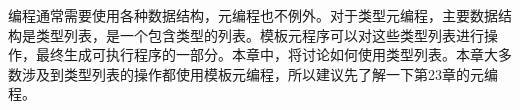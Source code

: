 编程通常需要使用各种数据结构，元编程也不例外。对于类型元编程，主要数据结构是类型列表，是一个包含类型的列表。模板元程序可以对这些类型列表进行操作，最终生成可执行程序的一部分。本章中，将讨论如何使用类型列表。本章大多数涉及到类型列表的操作都使用模板元编程，所以建议先了解一下第23章的元编程。